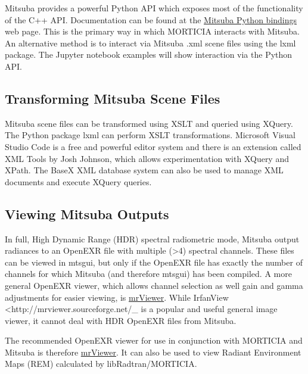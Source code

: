 Mitsuba provides a powerful Python API which exposes most of the
functionality of the C++ API. Documentation can be found at the
\href{http://www.mitsuba-renderer.org/api/group__libpython.html}{Mitsuba
Python bindings} web page. This is the primary way in which MORTICIA
interacts with Mitsuba. An alternative method is to interact via Mitsuba
.xml scene files using the lxml package. The Jupyter notebook examples
will show interaction via the Python API.

\subsection{Transforming Mitsuba Scene
Files}\label{transforming-mitsuba-scene-files}

Mitsuba scene files can be transformed using XSLT and queried using
XQuery. The Python package lxml can perform XSLT transformations.
Microsoft Visual Studio Code is a free and powerful editor system and
there is an extension called XML Tools by Josh Johnson, which allows
experimentation with XQuery and XPath. The BaseX XML database system can
also be used to manage XML documents and execute XQuery queries.

\subsection{Viewing Mitsuba Outputs}\label{viewing-mitsuba-outputs}

In full, High Dynamic Range (HDR) spectral radiometric mode, Mitsuba
output radiances to an OpenEXR file with multiple (\textgreater{}4)
spectral channels. These files can be viewed in mtsgui, but only if the
OpenEXR file has exactly the number of channels for which Mitsuba (and
therefore mtsgui) has been compiled. A more general OpenEXR viewer,
which allows channel selection as well gain and gamma adjustments for
easier viewing, is \href{http://mrviewer.sourceforge.net/}{mrViewer}.
While IrfanView \textless{}http://mrviewer.sourceforge.net/\_ is a
popular and useful general image viewer, it cannot deal with HDR OpenEXR
files from Mitsuba.

The recommended OpenEXR viewer for use in conjunction with MORTICIA and
Mitsuba is therefore \href{http://mrviewer.sourceforge.net/}{mrViewer}.
It can also be used to view Radiant Environment Maps (REM) calculated by
libRadtran/MORTICIA.
